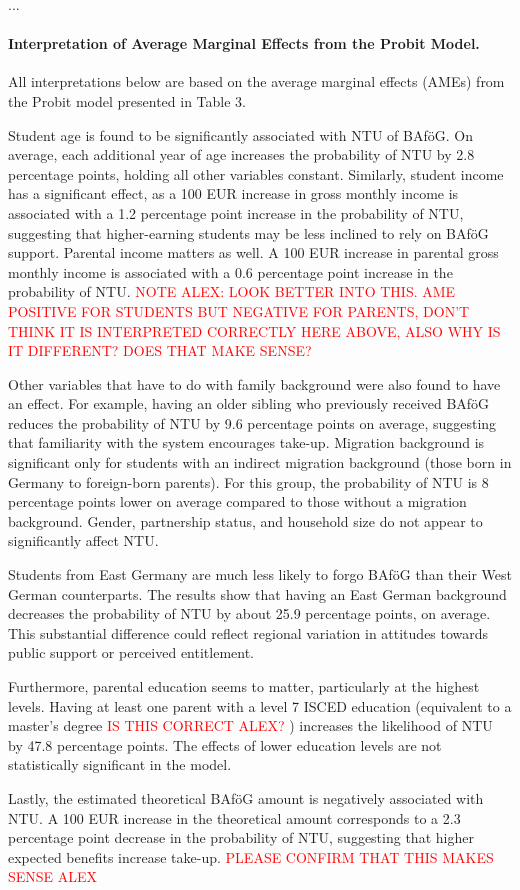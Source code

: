 ...

\paragraph{Interpretation of Average Marginal Effects from the Probit Model.} All interpretations below are based on the average marginal effects (AMEs) from the Probit model presented in Table 3.

Student age is found to be significantly associated with NTU of BAföG. On average, each additional year of age increases the probability of NTU by 2.8 percentage points, holding all other variables constant. Similarly, student income has a significant effect, as a 100 EUR increase in gross monthly income is associated with a 1.2 percentage point increase in the probability of NTU, suggesting that higher-earning students may be less inclined to rely on BAföG support. Parental income matters as well. A 100 EUR increase in parental gross monthly income is associated with a 0.6 percentage point increase in the probability of NTU. \textcolor{red}{NOTE ALEX: LOOK BETTER INTO THIS. AME POSITIVE FOR STUDENTS BUT NEGATIVE FOR PARENTS, DON’T THINK IT IS INTERPRETED CORRECTLY HERE ABOVE, ALSO WHY IS IT DIFFERENT? DOES THAT MAKE SENSE?}

Other variables that have to do with family background were also found to have an effect. For example, having an older sibling who previously received BAföG reduces the probability of NTU by 9.6 percentage points on average, suggesting that familiarity with the system encourages take-up. Migration background is significant only for students with an indirect migration background (those born in Germany to foreign-born parents). For this group, the probability of NTU is 8 percentage points lower on average compared to those without a migration background.  Gender, partnership status, and household size do not appear to significantly affect NTU.

Students from East Germany are much less likely to forgo BAföG than their West German counterparts. The results show that having an East German background decreases the probability of NTU by about 25.9 percentage points, on average. This substantial difference could reflect regional variation in attitudes towards public support or perceived entitlement.

Furthermore, parental education seems to matter, particularly at the highest levels. Having at least one parent with a level 7 ISCED education (equivalent to a master’s degree \textcolor{red}{IS THIS CORRECT ALEX?}
) increases the likelihood of NTU by 47.8 percentage points. The effects of lower education levels are not statistically significant in the model.

Lastly, the estimated theoretical BAföG amount is negatively associated with NTU. A 100 EUR increase in the theoretical amount corresponds to a 2.3 percentage point decrease in the probability of NTU, suggesting that higher expected benefits increase take-up. \textcolor{red}{PLEASE CONFIRM THAT THIS MAKES SENSE ALEX}


